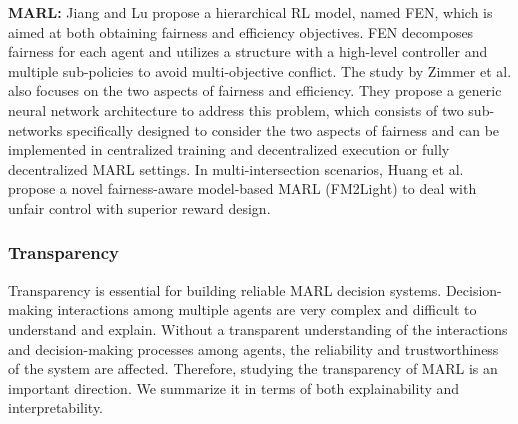 \documentclass[acmsmall]{acmart}
\begin{document}
% 
\textbf{MARL: }  Jiang and Lu \cite{NEURIPS2019_10493aa8} propose a hierarchical RL model, named FEN, which is aimed at both obtaining fairness and efficiency objectives. FEN decomposes fairness for each agent and utilizes a structure with a high-level controller and multiple sub-policies to avoid multi-objective conflict. The study by Zimmer et al. \cite{pmlr-v139-zimmer21a} also focuses on the two aspects of fairness and efficiency. They propose a generic neural network architecture to address this problem, which consists of two sub-networks specifically designed to consider the two aspects of fairness and can be implemented in centralized training and decentralized execution or fully decentralized MARL settings. 
In multi-intersection scenarios, Huang et al. \cite{huang2023fairnessaware} propose a novel fairness-aware model-based MARL (FM2Light) to deal with unfair control with superior reward design.

 
\subsubsection{Transparency}
Transparency is essential for building reliable MARL decision systems. Decision-making interactions among multiple agents are very complex and difficult to understand and explain. Without a transparent understanding of the interactions and decision-making processes among agents, the reliability and trustworthiness of the system are affected. Therefore, studying the transparency of MARL is an important direction. We summarize it in terms of both explainability and interpretability.
\end{document}
